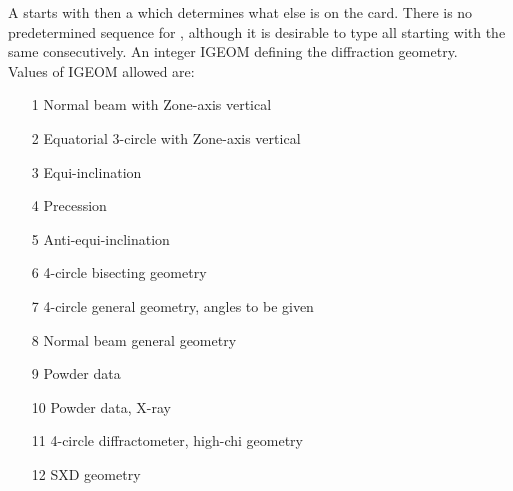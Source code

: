 %
\cardend\newpage
{}
%
A  starts with  then a \cw
which determines what else is
on the card.  There is no predetermined sequence for , although
it is
desirable to type all  starting with the same 
\cw consecutively.
\pn 
\cddf
% 
 {An integer IGEOM defining the diffraction geometry.\\
       Values of IGEOM allowed are:}
\par\begin{enumerate} {\setlength{\labelwidth}{2.5cm}
  \setlength{\parsep}{-1ex}
  \setlength{\leftmargin}{\labelwidth}
 \addtolength{\leftmargin}{2cm}}
\item[1 \hfill] Normal beam with Zone-axis vertical
\item[2 \hfill] Equatorial 3-circle with Zone-axis vertical
\item[3 \hfill] Equi-inclination
\item[4 \hfill] Precession
\item[5 \hfill] Anti-equi-inclination
\item[6 \hfill] 4-circle bisecting geometry
\item[7 \hfill] 4-circle general geometry, angles to be given
\item[8 \hfill] Normal beam general geometry
\item[9 \hfill] Powder data
\item[10 \hfill] Powder data, X-ray
\item[11 \hfill] 4-circle diffractometer, high-chi geometry
\item[12 \hfill] SXD geometry
\end{enumerate}
%
\par  
{}
